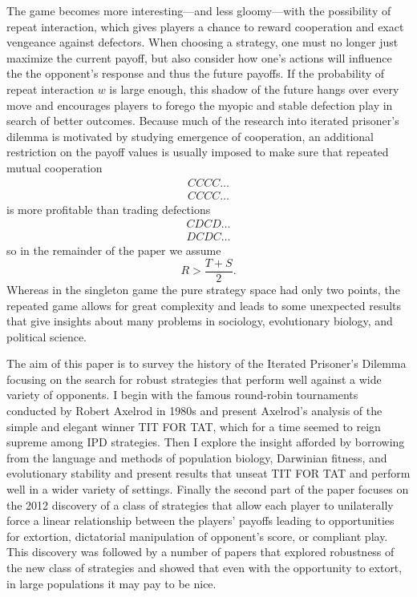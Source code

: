 The game becomes more interesting---and less gloomy---with the possibility of repeat interaction, which gives players a chance to reward cooperation and exact vengeance against defectors. When choosing a strategy, one must no longer just maximize the current payoff, but also consider how one's actions will influence the the opponent's response and thus the future payoffs. If the probability of repeat interaction $w$ is large enough, this shadow of the future hangs over every move and encourages players to forego the myopic and stable defection play in search of better outcomes. Because much of the research into iterated prisoner's dilemma is motivated by studying emergence of cooperation, an additional restriction on the payoff values is usually imposed to make sure that repeated mutual cooperation
\[
\begin{array}{c}
CCCC\dots \\
CCCC\dots
\end{array}
\]
is more profitable than trading defections
\[
\begin{array}{c}
CDCD\dots \\
DCDC\dots
\end{array}
\]
so in the remainder of the paper we assume
\[
R > \frac{T+S}{2}
.\]
Whereas in the singleton game the pure strategy space had only two points, the repeated game allows for great complexity and leads to some unexpected results that give insights about many problems in sociology, evolutionary biology, and political science.

The aim of this paper is to survey the history of the Iterated Prisoner's Dilemma focusing on the search for robust strategies that perform well against a wide variety of opponents. I begin with the famous round-robin tournaments conducted by Robert Axelrod in 1980s and present Axelrod's analysis of the simple and elegant winner TIT FOR TAT, which for a time seemed to reign supreme among IPD strategies. Then I explore the insight afforded by borrowing from the language and methods of population biology, Darwinian fitness, and evolutionary stability and present results that unseat TIT FOR TAT and perform well in a wider variety of settings. Finally the second part of the paper focuses on the 2012 discovery of a class of strategies that allow each player to unilaterally force a linear relationship between the players' payoffs leading to opportunities for extortion, dictatorial manipulation of opponent's score, or compliant play. This discovery was followed by a number of papers that explored robustness of the new class of strategies and showed that even with the opportunity to extort, in large populations it may pay to be nice.


